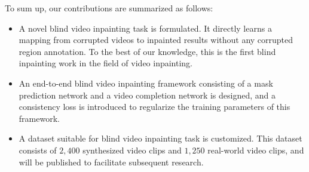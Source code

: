 To sum up, our contributions are summarized as follows:
\begin{itemize}

\item A novel blind video inpainting task is formulated. It directly learns a mapping from corrupted videos to inpainted results without any corrupted region annotation. To the best of our knowledge, this is the first blind inpainting work in the field of video inpainting.
  
\item An end-to-end blind video inpainting framework consisting of a mask prediction network and a video completion network is designed, and a consistency loss is introduced to regularize the training parameters of this framework.
  
\item A dataset suitable for blind video inpainting task is customized. This dataset consists of $2,400$ synthesized video clips and $1,250$ real-world video clips, and will be published to facilitate subsequent research. 
\end{itemize}











